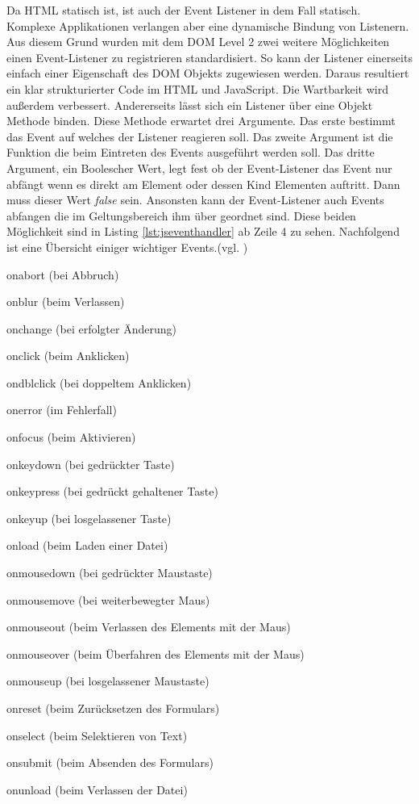Da HTML statisch ist, ist auch der Event Listener in dem Fall statisch. Komplexe Applikationen verlangen aber eine dynamische Bindung von Listenern. Aus diesem Grund wurden mit dem DOM Level 2 zwei weitere Möglichkeiten einen Event-Listener zu registrieren standardisiert. So kann der Listener einerseits einfach einer Eigenschaft des DOM Objekts zugewiesen werden. Daraus resultiert ein klar strukturierter Code im HTML und JavaScript. Die Wartbarkeit wird außerdem verbessert. Andererseits lässt sich ein Listener über eine Objekt Methode binden. Diese Methode erwartet drei Argumente. Das erste bestimmt das Event auf welches der Listener reagieren soll. Das zweite Argument ist die Funktion die beim Eintreten des Events ausgeführt werden soll. Das dritte Argument, ein Boolescher Wert, legt fest ob der Event-Listener das Event nur abfängt wenn es direkt am Element oder dessen Kind Elementen auftritt. Dann muss dieser Wert \textit{false} sein. Ansonsten kann der Event-Listener auch Events abfangen die im Geltungsbereich ihm über geordnet sind. Diese beiden Möglichkeit sind in Listing \ref{lst:jseventhandler} ab Zeile 4 zu sehen. Nachfolgend ist eine Übersicht einiger wichtiger Events.(vgl. \cite[S.428ff]{FlanJava2007})

	\vspace{1em}
    \begin{compactitem}
	    \item onabort (bei Abbruch)
	    \item onblur (beim Verlassen)
	    \item onchange (bei erfolgter Änderung)
	    \item onclick (beim Anklicken)
	    \item ondblclick (bei doppeltem Anklicken)
	    \item onerror (im Fehlerfall)
	    \item onfocus (beim Aktivieren)
	    \item onkeydown (bei gedrückter Taste)
	    \item onkeypress (bei gedrückt gehaltener Taste)
	    \item onkeyup (bei losgelassener Taste)
	    \item onload (beim Laden einer Datei)
	    \item onmousedown (bei gedrückter Maustaste)
	    \item onmousemove (bei weiterbewegter Maus)
	    \item onmouseout (beim Verlassen des Elements mit der Maus)
	    \item onmouseover (beim Überfahren des Elements mit der Maus)
	    \item onmouseup (bei losgelassener Maustaste)
	    \item onreset (beim Zurücksetzen des Formulars)
	    \item onselect (beim Selektieren von Text)
	    \item onsubmit (beim Absenden des Formulars)
	    \item onunload (beim Verlassen der Datei)
    \end{compactitem}

